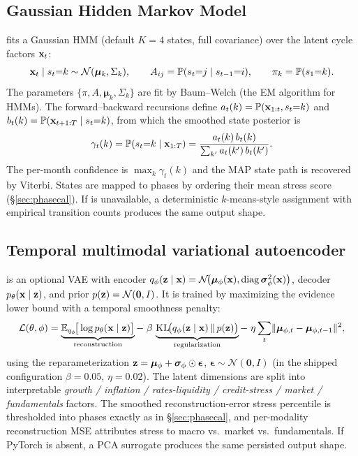 \documentclass[11pt]{article}
\begin{document}
\subsection{Gaussian Hidden Markov Model}
\label{sec:hmm}
 fits a Gaussian HMM (default $K=4$ states, full covariance)
over the latent cycle factors $\mathbf{x}_t$:
\begin{equation}
  \mathbf{x}_t\mid s_t{=}k\sim\mathcal N(\boldsymbol\mu_k,\Sigma_k),\qquad
  A_{ij}=\mathbb{P}(s_t{=}j\mid s_{t-1}{=}i),\qquad
  \pi_k=\mathbb{P}(s_1{=}k).
\end{equation}
The parameters $\{\pi,A,\boldsymbol\mu_k,\Sigma_k\}$ are fit by Baum--Welch
(the EM algorithm for HMMs). The forward--backward recursions define
$a_t(k)=\mathbb{P}(\mathbf{x}_{1:t},s_t{=}k)$ and $b_t(k)=\mathbb{P}(\mathbf{x}_{t+1:T}\mid s_t{=}k)$,
from which the smoothed state posterior is
\begin{equation}
  \gamma_t(k)=\mathbb{P}(s_t{=}k\mid\mathbf{x}_{1:T})
  =\frac{a_t(k)\,b_t(k)}{\sum_{k'}a_t(k')\,b_t(k')} .
\end{equation}
The per-month confidence is $\max_k\gamma_t(k)$ and the MAP state path is recovered
by Viterbi. States are mapped to phases by ordering their mean stress score
(\S\ref{sec:phasecal}). If  is unavailable, a deterministic
$k$-means-style assignment with empirical transition counts produces the same
output shape.

\subsection{Temporal multimodal variational autoencoder}
\label{sec:vae}
 is an optional VAE with encoder
$q_\phi(\mathbf{z}\mid\mathbf{x})=\mathcal N\!\big(\boldsymbol\mu_\phi(\mathbf{x}),\operatorname{diag}\boldsymbol\sigma_\phi^2(\mathbf{x})\big)$,
decoder $p_\theta(\mathbf{x}\mid\mathbf{z})$, and prior $p(\mathbf{z})=\mathcal N(\mathbf0,I)$. It is
trained by maximizing the evidence lower bound with a temporal smoothness penalty:
\begin{equation}
  \mathcal L(\theta,\phi)=
  \underbrace{\mathbb{E}_{q_\phi}\!\big[\log p_\theta(\mathbf{x}\mid\mathbf{z})\big]}_{\text{reconstruction}}
  -\;\beta\,\underbrace{\mathrm{KL}\!\big(q_\phi(\mathbf{z}\mid\mathbf{x})\,\Vert\,p(\mathbf{z})\big)}_{\text{regularization}}
  -\;\eta\sum_t\lVert\boldsymbol\mu_{\phi,t}-\boldsymbol\mu_{\phi,t-1}\rVert^2,
\end{equation}
using the reparameterization
$\mathbf{z}=\boldsymbol\mu_\phi+\boldsymbol\sigma_\phi\odot\boldsymbol\epsilon$,
$\boldsymbol\epsilon\sim\mathcal N(\mathbf0,I)$ (in the shipped configuration
$\beta=0.05$, $\eta=0.02$). The latent dimensions are split into interpretable
\emph{growth / inflation / rates-liquidity / credit-stress / market /
fundamentals} factors. The smoothed reconstruction-error stress percentile is
thresholded into phases exactly as in \S\ref{sec:phasecal}, and per-modality
reconstruction MSE attributes stress to macro vs.\ market vs.\ fundamentals. If
PyTorch is absent, a PCA surrogate produces the same persisted output shape.
\end{document}
